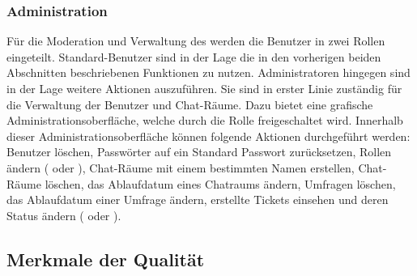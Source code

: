 \subsubsection{Administration}
Für die Moderation und Verwaltung des  werden die Benutzer in zwei Rollen eingeteilt.
Standard-Benutzer sind in der Lage die in den vorherigen beiden Abschnitten beschriebenen Funktionen zu nutzen.
Administratoren hingegen sind in der Lage weitere Aktionen auszuführen.
Sie sind in erster Linie zuständig für die Verwaltung der Benutzer und Chat-Räume.
Dazu bietet  eine grafische Administrationsoberfläche, welche durch die Rolle  freigeschaltet wird.
\newparagraph
Innerhalb dieser Administrationsoberfläche können folgende Aktionen durchgeführt werden:
Benutzer löschen, Passwörter auf ein Standard Passwort zurücksetzen, Rollen ändern ( oder ), Chat-Räume mit einem bestimmten Namen erstellen, Chat-Räume löschen, das Ablaufdatum eines Chatraums ändern, Umfragen löschen, das Ablaufdatum einer Umfrage ändern, erstellte Tickets einsehen und deren Status ändern ( oder ).

\subsection{Merkmale der Qualität}\label{sec:ProduktUndGebrauchsqualitaet}

